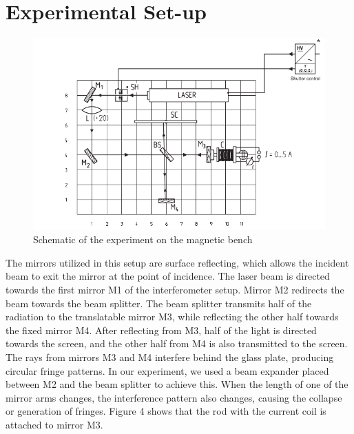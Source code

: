 \chapter{\label{method}Experimental Set-up}


\begin{figure}
	\centering
	\includegraphics[width=0.7\linewidth]{schematic}
	\caption{Schematic of the experiment on the magnetic bench}
	\label{fig:schematic}
\end{figure}
The mirrors utilized in this setup are surface reflecting, which allows the incident beam to exit the mirror at the point of incidence. The laser beam is directed towards the first mirror M1 of the interferometer setup. Mirror M2 redirects the beam towards the beam splitter. The beam splitter transmits half of the radiation to the translatable mirror M3, while reflecting the other half towards the fixed mirror M4. After reflecting from M3, half of the light is directed towards the screen, and the other half from M4 is also transmitted to the screen. The rays from mirrors M3 and M4 interfere behind the glass plate, producing circular fringe patterns. In our experiment, we used a beam expander placed between M2 and the beam splitter to achieve this. When the length of one of the mirror arms changes, the interference pattern also changes, causing the collapse or generation of fringes. Figure 4 shows that the rod with the current coil is attached to mirror M3.

